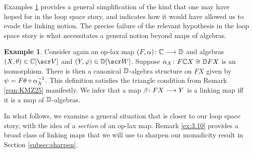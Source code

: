 \documentclass{amsart}
\theoremstyle{definition}
\newtheorem{exmp}[thm]{Example}
\begin{document}
Examples \ref{ex:2.8} provides a general simplification of the kind that one may have hoped for in the loop space story, and indicates how it would have allowed us to evade the linking notion. The precise failure of the relevant hypothesis in the loop space story is what necessitates a general notion beyond maps of algebras.
\begin{exmp}\label{ex:2.8}
    Consider again an op-lax map $(F,\alpha) \colon \mathbb{C} \longrightarrow \mathbb{D}$ and algebras $(X,\tha) \in \bC[\sV]$ and $(Y,\phz) \in \bD[\sW]$. Suppose $\alpha_X \colon F \mathbb{C} X \cong \mathbb{D} F X$ is an isomorphism. There is then a canonical $\mathbb{D}$-algebra structure on $FX$ given by $\psi = F \theta \circ \alpha_X^{-1}$. This definition satisfies the triangle condition from Remark \ref{rem:KMZ25} manifestly. We infer that a map $\beta \colon FX \longrightarrow Y$
    is a linking map iff it is a map of $\mathbb{D}$-algebras.
\end{exmp}

In what follows, we examine a general situation that is closer to our loop space story, with the idea of a \emph{section} of an op-lax map. Remark \ref{ex:3.10} provides a broad class of linking maps that we will use to sharpen our monadicity result in Section \ref{subsec:sharpen}.
\end{document}
